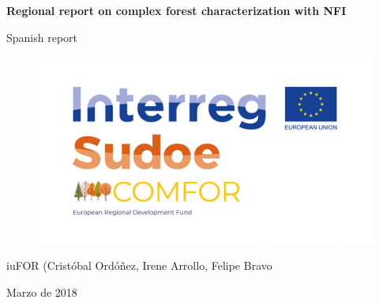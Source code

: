 \usepackage{float}
\usepackage{longtable}
\usepackage[spanish]{babel}
\usepackage{titling}
\usepackage{eurosym}

\begin{titlepage}
  \begin{center}

    \begin{spacing}{0.51}
      \textbf{\huge Regional report on complex forest characterization with NFI} 
      \vspace*{\fill}
    \end{spacing}
    
    \begin{spacing}{0.51}
      {\large Spanish report}
      \vspace*{\fill}
    \end{spacing}

    \begin{figure}[ht]
      \centering      
      \includegraphics[scale=0.21]{./imagenes/COMFOR-logo.jpg}
    \end{figure}
    
    \begin{spacing}{0.51}
      \textcolor{other}
      iuFOR (Cristóbal Ordóñez, Irene Arrollo, Felipe Bravo  \\ [0.5cm]
      \vspace*{\fill}
    \end{spacing}
      
    \begin{spacing}{0.51}
      Marzo de 2018 \\
      \vspace*{\fill}
    \end{spacing}


\end{center}
\end{titlepage}
